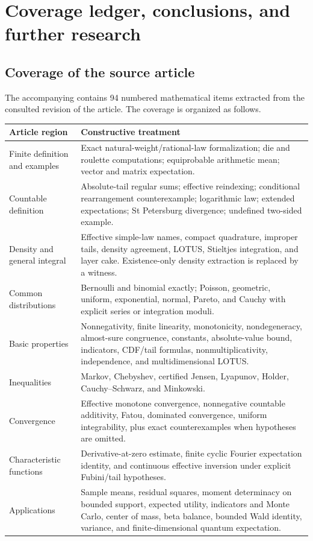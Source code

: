 \section{Coverage ledger, conclusions, and further research}\label{sec:conclusion}

\subsection{Coverage of the source article}

The accompanying  contains 94 numbered mathematical
items extracted from the consulted revision of the article.  The coverage is
organized as follows.

\begin{longtable}{@{}p{}p{}@{}}
\toprule
Article region & Constructive treatment \\
\midrule
\endhead
Finite definition and examples & Exact natural-weight/rational-law
formalization; die and roulette computations; equiprobable arithmetic mean;
vector and matrix expectation. \\
Countable definition & Absolute-tail regular sums; effective reindexing;
conditional rearrangement counterexample; logarithmic law; extended
expectations; St Petersburg divergence; undefined two-sided example. \\
Density and general integral & Effective simple-law names, compact quadrature,
improper tails, density agreement, LOTUS, Stieltjes integration, and layer
cake.  Existence-only density extraction is replaced by a witness. \\
Common distributions & Bernoulli and binomial exactly; Poisson, geometric,
uniform, exponential, normal, Pareto, and Cauchy with explicit series or
integration moduli. \\
Basic properties & Nonnegativity, finite linearity, monotonicity,
nondegeneracy, almost-sure congruence, constants, absolute-value bound,
indicators, CDF/tail formulas, nonmultiplicativity, independence, and
multidimensional LOTUS. \\
Inequalities & Markov, Chebyshev, certified Jensen, Lyapunov, Holder,
Cauchy--Schwarz, and Minkowski. \\
Convergence & Effective monotone convergence, nonnegative countable additivity,
Fatou, dominated convergence, uniform integrability, plus exact counterexamples
when hypotheses are omitted. \\
Characteristic functions & Derivative-at-zero estimate, finite cyclic Fourier
expectation identity, and continuous effective inversion under explicit
Fubini/tail hypotheses. \\
Applications & Sample means, residual squares, moment determinacy on bounded
support, expected utility, indicators and Monte Carlo, center of mass, beta
balance, bounded Wald identity, variance, and finite-dimensional quantum
expectation. \\
\bottomrule
\end{longtable}

